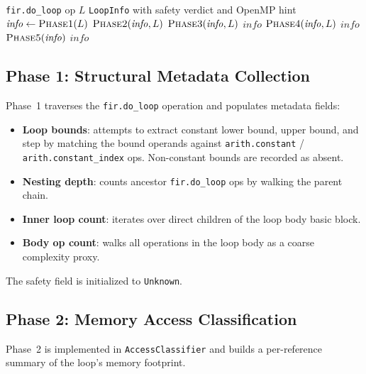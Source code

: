 \documentclass[conference]{IEEEtran}
\begin{document}
\begin{algorithm}
\caption{FPA Five-Phase Loop Classification}
\label{alg:main}
\begin{algorithmic}[1]
\REQUIRE \texttt{fir.do\_loop} op $L$
\ENSURE \texttt{LoopInfo} with safety verdict and OpenMP hint
\STATE $\mathit{info} \leftarrow \textsc{Phase1}(L)$ 
\STATE $\textsc{Phase2}(\mathit{info}, L)$ 
\STATE $\textsc{Phase3}(\mathit{info}, L)$ 
  \RETURN $\mathit{info}$
\ENDIF
\STATE $\textsc{Phase4}(\mathit{info}, L)$ 
  \RETURN $\mathit{info}$
\ENDIF
\STATE $\textsc{Phase5}(\mathit{info})$ 
\RETURN $\mathit{info}$
\end{algorithmic}
\end{algorithm}

\subsection{Phase 1: Structural Metadata Collection}

Phase~1 traverses the \texttt{fir.do\_loop} operation and populates
metadata fields:
\begin{itemize}
  \item \textbf{Loop bounds}: attempts to extract constant
        lower bound, upper bound, and step by matching the bound
        operands against \texttt{arith.constant} / \texttt{arith.constant\_index}
        ops.  Non-constant bounds are recorded as absent.
  \item \textbf{Nesting depth}: counts ancestor \texttt{fir.do\_loop}
        ops by walking the parent chain.
  \item \textbf{Inner loop count}: iterates over direct children of
        the loop body basic block.
  \item \textbf{Body op count}: walks all operations in the loop body
        as a coarse complexity proxy.
\end{itemize}
The safety field is initialized to \texttt{Unknown}.

\subsection{Phase 2: Memory Access Classification}

Phase~2 is implemented in \texttt{AccessClassifier} and builds a
per-reference summary of the loop's memory footprint.
\end{document}
